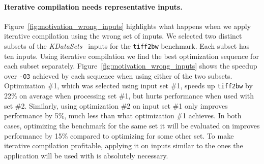     \paragraph{Iterative compilation needs representative inputs.}

    Figure~\ref{fig:motivation_wrong_inputs} highlights what happens when we apply iterative compilation using the wrong set of inputs. We
    selected two distinct subsets of the \textit{KDataSets}~\cite{chen10,chen12a} inputs for the \texttt{tiff2bw} benchmark. Each subset
    has ten inputs. Using iterative compilation we find the best optimization sequence for each subset separately.
    Figure~\ref{fig:motivation_wrong_inputs} shows the speedup over \texttt{-O3} achieved by each sequence when using either of the two
    subsets. Optimization \#1, which was selected using input set \#1, speeds up \texttt{tiff2bw} by 22\% on average when processing set
    \#1, but hurts performance when used with set \#2. Similarly, using optimization \#2 on input set \#1 only improves performance by 5\%,
    much less than what optimization \#1 achieves. In both cases, optimizing the benchmark for the same set it will be evaluated on
    improves performance by 15\% compared to optimizing for some other set. To make iterative compilation profitable, applying it on
    inputs similar to the ones the application will be used with is absolutely necessary.



